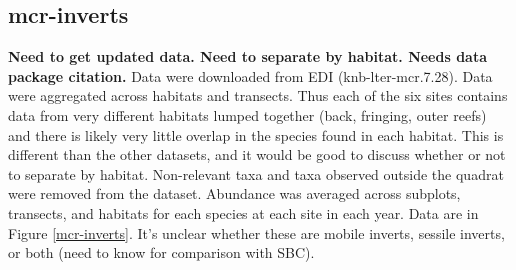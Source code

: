 \documentclass[11pt, oneside]{article}
\begin{document}
\subsection {mcr-inverts}
{\bf Need to get updated data. Need to separate by habitat. Needs data package citation.}
Data were downloaded from EDI (knb-lter-mcr.7.28).
Data were aggregated across habitats and transects.
Thus each of the six sites contains data from very different habitats lumped together (back, fringing, outer reefs) and there is likely very little overlap in the species found in each habitat. 
This is different than the other datasets, and it would be good to discuss whether or not to separate by habitat.
Non-relevant taxa and taxa observed outside the quadrat were removed from the dataset.
Abundance was averaged across subplots, transects, and habitats for each species at each site in each year.
Data are in Figure \ref{mcr-inverts}.
It's unclear whether these are mobile inverts, sessile inverts, or both (need to know for comparison with SBC).
\end{document}

